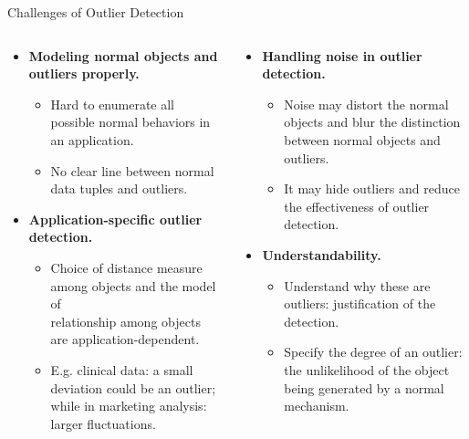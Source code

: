 \begin{frame}{Challenges of Outlier Detection}
	\begin{columns}
		\begin{column}{0.55\textwidth}
			\begin{itemize}
				\item \textbf{Modeling normal objects and outliers properly.}
				      \begin{itemize}
					      \item Hard to enumerate all possible normal behaviors in an application.
					      \item No clear line between normal data tuples and outliers.
				      \end{itemize}
				\item \textbf{Application-specific outlier detection.}
				      \begin{itemize}
					      \item Choice of distance measure among objects and the model of \\
					            relationship among objects are application-dependent.
					      \item E.g. clinical data: a small deviation could be an outlier; \\
					            while in marketing analysis: larger fluctuations.
				      \end{itemize}
			\end{itemize}
		\end{column}

		\begin{column}{0.45\textwidth}
			\begin{itemize}
				\item \textbf{Handling noise in outlier detection.}
				      \begin{itemize}
					      \item Noise may distort the normal objects and blur the distinction \\
					            between normal objects and outliers.
					      \item It may hide outliers and reduce the effectiveness of outlier detection.
				      \end{itemize}
				\item \textbf{Understandability.}
				      \begin{itemize}
					      \item Understand why these are outliers: justification of the detection.
					      \item Specify the degree of an outlier: \\
					            the unlikelihood of the object being generated by a normal mechanism.
				      \end{itemize}
			\end{itemize}
		\end{column}
	\end{columns}
\end{frame}
